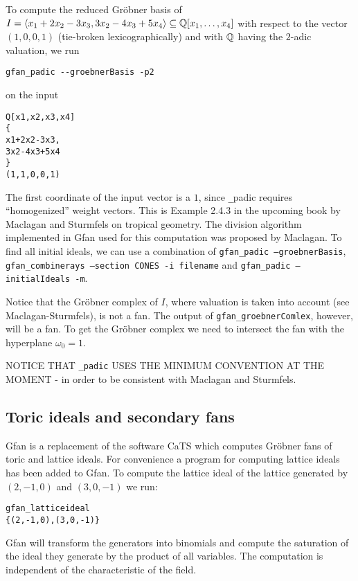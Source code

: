 \begin{example}
To compute the reduced Gr\"obner basis of $I=\langle x_1+2x_2-3x_3, 3x_2-4x_3+5x_4\rangle\subseteq \mathbb{Q}[x_1,\dots,x_4]$ with respect to the vector $(1,0,0,1)$ (tie-broken lexicographically) and with $\mathbb{Q}$ having the $2$-adic valuation,
we run
\begin{verbatim}
gfan_padic --groebnerBasis -p2
\end{verbatim}
on the input
\begin{verbatim}
Q[x1,x2,x3,x4]
{
x1+2x2-3x3,
3x2-4x3+5x4
}
(1,1,0,0,1)
\end{verbatim}
The first coordinate of the input vector is a $1$, since {\texttt \_padic} requires ``homogenized'' weight vectors. This is Example 2.4.3 in the upcoming book by Maclagan and Sturmfels on tropical geometry. The division algorithm implemented in Gfan used for this computation was proposed by Maclagan. To find all initial ideals, we can use a combination of \texttt{gfan\_padic --groebnerBasis}, \texttt{gfan\_combinerays --section CONES -i filename} and \texttt{gfan\_padic --initialIdeals -m}.

Notice that the Gr\"obner complex of $I$, where valuation is taken into account (see Maclagan-Sturmfels), is not a fan. The output of \texttt{gfan\_groebnerComlex}, however, will be a fan. To get the Gr\"obner complex we need to intersect the fan with the hyperplane $\omega_0=1$.

NOTICE THAT \texttt{\_padic} USES THE MINIMUM CONVENTION AT THE MOMENT - in order to be consistent with Maclagan and Sturmfels.
\end{example}


\subsection{Toric ideals and secondary fans}

Gfan is a replacement of the software CaTS \cite{cats} which computes Gr\"obner fans of toric and lattice ideals.
For convenience a program for computing lattice ideals has been added to Gfan.
To compute the lattice ideal of the lattice generated by $(2,-1,0)$ and $(3,0,-1)$ we run:
\begin{verbatim}
gfan_latticeideal
{(2,-1,0),(3,0,-1)}
\end{verbatim}
Gfan will transform the generators into binomials and compute the
saturation of the ideal they generate by the product of all variables. The computation is independent of the characteristic of the field.

